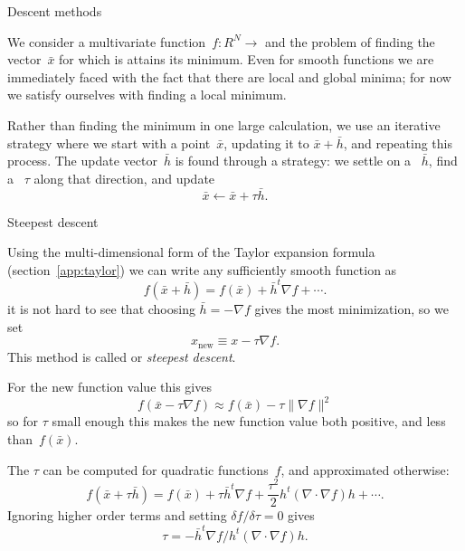 
 {Descent methods}

We consider a multivariate function~$f\colon R^N\rightarrow $ and the
problem of finding the vector~$\bar x$ for which is attains its
minimum. Even for smooth functions we are immediately faced with the
fact that there are local and global minima; for now we satisfy
ourselves with finding a local minimum.

Rather than finding the minimum in one large calculation, we use an
iterative strategy where we start with a point~$\bar x$,
updating it to $\bar x+\bar h$, and repeating this process.
The update vector~$\bar h$ is found through a 
strategy:
we settle on a ~$\bar h$,
find a ~$\tau$ along that direction, and update
\[ \bar x\leftarrow \bar x+\tau \bar h. \]

 {Steepest descent}

Using the multi-dimensional form of the Taylor expansion formula
(section~\ref{app:taylor}) we can write any sufficiently smooth
function as
\[ f(\bar x+\bar h) = f(\bar x) + \bar h^t \nabla f +\cdots. \]
it is not hard to see that choosing $\bar h=-\nabla f$ gives the most
minimization, so we set
\[ x_{\scriptstyle\mathrm{new}}\equiv x-\tau \nabla f. \]
This method is called 
or
\emph{steepest descent}.

For the new function value this gives
\[ f(\bar x - \tau \nabla f ) \approx f(\bar x) - \tau \| \nabla f \|^2 \]
so for $\tau$ small enough this makes the new function value both
positive, and less than~$f(\bar x)$.

The  $\tau$ can be computed for quadratic
functions~$f$, and approximated otherwise:
\[ f(\bar x+\tau\bar h) = f(\bar x) + \tau\bar h^t \nabla f +
\frac{\tau^2}2 h^t (\nabla\cdot\nabla f) h +\cdots. \]
Ignoring higher order terms and setting
$\delta f/\delta\tau=0$
gives
\[ \tau = - \bar h^t \nabla f / h^t (\nabla\cdot\nabla f) h. \]


